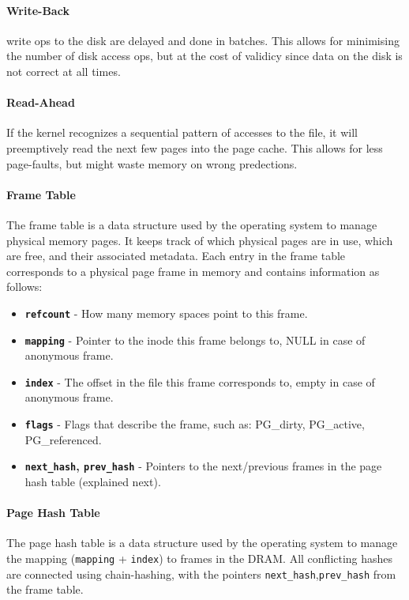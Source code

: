 \documentclass[openany,12pt]{book}
\newcommand{\code}[1]{\texttt{#1}}
\begin{document}
\paragraph{Write-Back} write ops to the disk are delayed and done in batches. This allows for minimising the number of disk access ops, but at the cost of validicy since data on the disk is not correct at all times.


\paragraph{Read-Ahead} If the kernel recognizes a sequential pattern of accesses to the file, it will preemptively read the next few pages into the page cache. This allows for less page-faults, but might waste memory on wrong predections.



\paragraph{Frame Table} The frame table is a data structure used by the operating system to manage physical memory pages. It keeps track of which physical pages are in use, which are free, and their associated metadata. Each entry in the frame table corresponds to a physical page frame in memory and contains information as follows:
\begin{itemize}
  \item \textbf{\code{refcount}} - How many memory spaces point to this frame.

  \item \textbf{\code{mapping}} - Pointer to the inode this frame belongs to, NULL in case of anonymous frame.

  \item \textbf{\code{index}} - The offset in the file this frame corresponds to, empty in case of anonymous frame.

  \item \textbf{\code{flags}} - Flags that describe the frame, such as: PG\_dirty, PG\_active, PG\_referenced.

  \item \textbf{\code{next\_hash}, \code{prev\_hash}} - Pointers to the next/previous frames in the page hash table (explained next).
\end{itemize}



\paragraph{Page Hash Table} The page hash table is a data structure used by the operating system to manage the mapping (\code{mapping} + \code{index}) to frames in the DRAM. All conflicting hashes are connected using chain-hashing, with the pointers \code{next\_hash},\code{prev\_hash} from the frame table.
\end{document}
